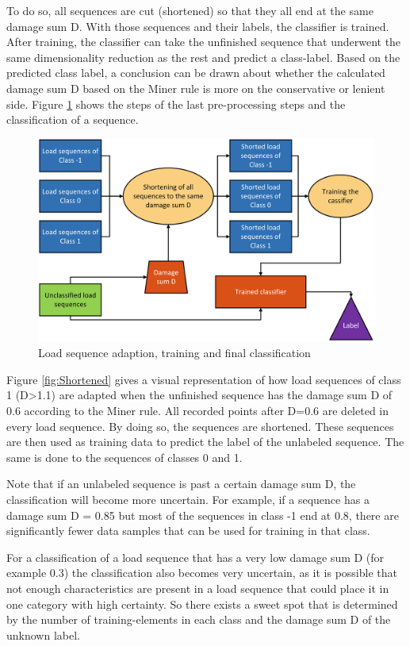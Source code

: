 To do so, all sequences are cut (shortened) so that they all end at the same damage sum D. 
With those sequences and their labels, the classifier is trained.
After training, the classifier can take the unfinished sequence that underwent the same dimensionality reduction as the rest and predict a class-label. 
Based on the predicted class label, a conclusion can be drawn about whether the calculated damage sum D based on the Miner rule is more on the conservative or lenient side. Figure \ref{fig:Class} shows the steps of the last pre-processing steps and the classification of a sequence.


\begin{figure}[H]
	\centering
	\includegraphics[width=0.9\linewidth]{IMGs/Class.png}
	\caption{Load sequence adaption, training and final classification }
	\label{fig:Class}
\end{figure}


Figure \ref{fig:Shortened} gives a visual representation of how load sequences of class 1 (D>1.1) are adapted when the unfinished sequence has the damage sum D of 0.6 according to the Miner rule.
All recorded points after D=0.6 are deleted in every load sequence. By doing so, the sequences are shortened. These sequences are then used as training data to predict the label of the unlabeled sequence. The same is done to the sequences of classes 0 and 1.

Note that if an unlabeled sequence is past a certain damage sum D, the classification will become more uncertain. For example, if a sequence has a damage sum D = 0.85 but most of the sequences in class -1 end at 0.8, there are significantly fewer data samples that can be used for training in that class. 

For a classification of a load sequence that has a very low damage sum D (for example 0.3) the classification also becomes very uncertain, as it is possible that not enough characteristics are present in a load sequence that could place it in one category with high certainty.
So there exists a sweet spot that is determined by the number of training-elements in each class and the damage sum D of the unknown label.

